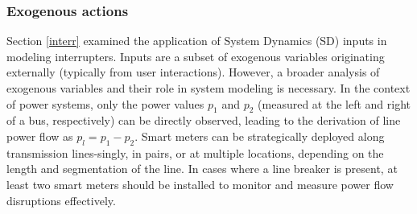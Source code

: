 \documentclass[11pt, a4paper]{article}
\begin{document}
\subsubsection{Exogenous actions}

Section \ref{interr} examined the application of System Dynamics (SD) inputs in modeling interrupters. Inputs are a subset of exogenous variables originating externally (typically from user interactions). However, a broader analysis of exogenous variables and their role in system modeling is necessary. In the context of power systems, only the power values $p_1$ and $p_2$ (measured at the left and right of a bus, respectively) can be directly observed, leading to the derivation of line power flow as $p_l=p_1-p_2$.
Smart meters can be strategically deployed along transmission lines-singly, in pairs, or at multiple locations, depending on the length and segmentation of the line. In cases where a line breaker is present, at least two smart meters should be installed to monitor and measure power flow disruptions effectively.
\end{document}

